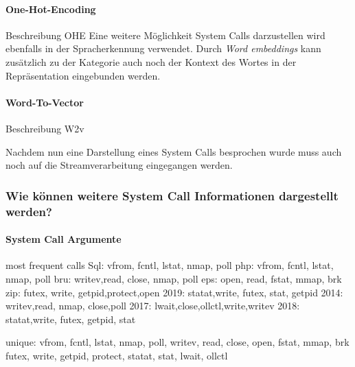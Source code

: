             \paragraph{One-Hot-Encoding}
                Beschreibung OHE
            Eine weitere Möglichkeit System Calls darzustellen wird ebenfalls in der Spracherkennung verwendet.
            Durch \textit{Word embeddings} kann zusätzlich zu der Kategorie auch noch der Kontext des Wortes in der Repräsentation eingebunden werden.
            \paragraph{Word-To-Vector}
                Beschreibung W2v

            Nachdem nun eine Darstellung eines System Calls besprochen wurde muss auch noch auf die Streamverarbeitung eingegangen werden.

            \subsubsection{Wie können weitere System Call Informationen dargestellt werden?}\label{sec:Meta}

            \paragraph{System Call Argumente}  
                most frequent calls
                Sql: vfrom, fcntl, lstat, nmap, poll
                php: vfrom, fcntl, lstat, nmap, poll
                bru: writev,read,  close, nmap, poll
                eps: open,  read,  fstat, mmap, brk
                zip: futex, write, getpid,protect,open
                2019: statat,write, futex, stat, getpid
                2014: writev,read,  nmap,  close,poll
                2017: lwait,close,ollctl,write,writev
                2018: statat,write, futex, getpid, stat


                unique:
                    vfrom, fcntl, lstat, nmap, poll, writev, read, close, open, fstat, mmap, brk
                    futex, write, getpid, protect, statat, stat, lwait, ollctl

